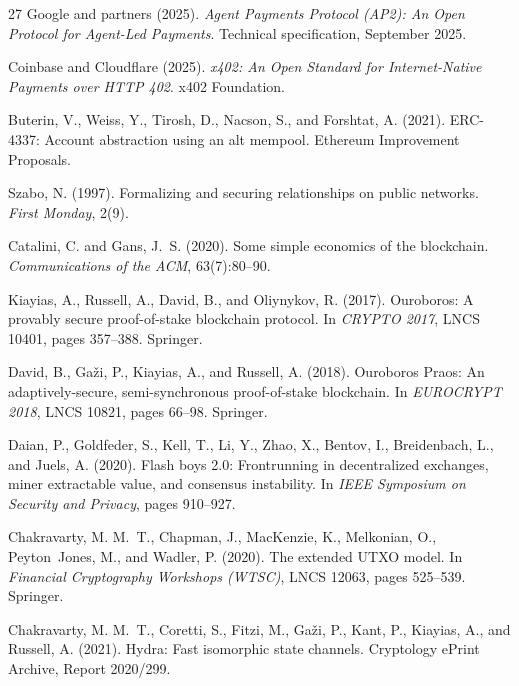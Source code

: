 \documentclass[11pt]{article}
\begin{document}
\begin{thebibliography}{27}
Google and partners (2025). \emph{Agent Payments Protocol (AP2): An Open
Protocol for Agent-Led Payments}. Technical specification, September 2025.

Coinbase and Cloudflare (2025). \emph{x402: An Open Standard for
Internet-Native Payments over {HTTP} 402}. x402 Foundation.

Buterin, V., Weiss, Y., Tirosh, D., Nacson, S., and Forshtat, A. (2021).
{ERC-4337}: Account abstraction using an alt mempool. Ethereum
Improvement Proposals.

Szabo, N. (1997). Formalizing and securing relationships on public
networks. \emph{First Monday}, 2(9).

Catalini, C. and Gans, J.~S. (2020). Some simple economics of the
blockchain. \emph{Communications of the ACM}, 63(7):80--90.

Kiayias, A., Russell, A., David, B., and Oliynykov, R. (2017). Ouroboros:
A provably secure proof-of-stake blockchain protocol. In \emph{CRYPTO
2017}, LNCS 10401, pages 357--388. Springer.

David, B., Ga\v{z}i, P., Kiayias, A., and Russell, A. (2018). Ouroboros
Praos: An adaptively-secure, semi-synchronous proof-of-stake blockchain.
In \emph{EUROCRYPT 2018}, LNCS 10821, pages 66--98. Springer.

Daian, P., Goldfeder, S., Kell, T., Li, Y., Zhao, X., Bentov, I.,
Breidenbach, L., and Juels, A. (2020). Flash boys 2.0: Frontrunning in
decentralized exchanges, miner extractable value, and consensus
instability. In \emph{IEEE Symposium on Security and Privacy}, pages
910--927.

Chakravarty, M. M.~T., Chapman, J., MacKenzie, K., Melkonian, O.,
Peyton~Jones, M., and Wadler, P. (2020). The extended {UTXO} model. In
\emph{Financial Cryptography Workshops (WTSC)}, LNCS 12063, pages
525--539. Springer.

Chakravarty, M. M.~T., Coretti, S., Fitzi, M., Ga\v{z}i, P., Kant, P.,
Kiayias, A., and Russell, A. (2021). Hydra: Fast isomorphic state
channels. Cryptology ePrint Archive, Report 2020/299.


\end{thebibliography}
\end{document}
